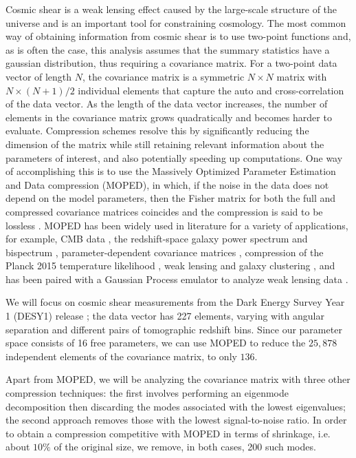 \documentclass[aps, prd, twocolumn, superscriptaddress, nofootinbib, amssymb, amsmath]{revtex4-2}
\begin{document}
Cosmic shear is a weak lensing effect caused by the large-scale structure of the universe and is an important tool for constraining cosmology. The most common way of obtaining information from cosmic shear is to use two-point functions and, as is often the case, this analysis assumes that the summary statistics have a gaussian distribution, thus requiring a covariance matrix. For a two-point data vector of length $N$, the covariance matrix is a symmetric $N\times N$ matrix with $N\times (N+1)/2$ individual elements that capture the auto and cross-correlation of the data vector. As the length of the data vector increases, the number of elements in the covariance matrix grows quadratically and becomes harder to evaluate. Compression schemes resolve this by significantly reducing the dimension of the matrix while still retaining relevant information about the parameters of interest, and also potentially speeding up computations. One way of accomplishing this is to use the Massively Optimized Parameter Estimation and Data compression (MOPED), in which, if the noise in the data does not depend on the model parameters, then the Fisher matrix for both the full and compressed covariance matrices coincides and the compression is said to be lossless \cite{Heavens:2000hjl, Tegmark:1997maa}. MOPED has been widely used in literature for a variety of applications, for example, CMB data \cite{Zablocki:2015zcm}, the redshift-space galaxy power spectrum and bispectrum \cite{Gualdi:2018mjl}, parameter-dependent covariance matrices \cite{Heavens:2017smv}, compression of the Planck 2015 temperature likelihood \cite{Heather:2019d}, weak lensing and galaxy clustering \cite{Ruggeri:2020rb}, and has been paired with a Gaussian Process emulator to analyze weak lensing data \cite{Mootoovaloo:2020}.

We will focus on cosmic shear measurements from the Dark Energy Survey Year 1 (DESY1) release \cite{Troxel:2017xyo,Abbott:2018cms}; the data vector has 227 elements, varying with angular separation and different pairs of tomographic redshift bins. Since our parameter space consists of 16 free parameters, we can use MOPED to reduce the $25,878$ independent elements of the covariance matrix, to only $136$.

Apart from MOPED, we will be analyzing the covariance matrix with three other compression techniques: the first involves performing an eigenmode decomposition then discarding the modes associated with the lowest eigenvalues; the second approach removes those with the lowest signal-to-noise ratio. In order to obtain a compression competitive with MOPED in terms of shrinkage, i.e. about $10\%$ of the original size, we remove, in both cases, 200 such modes.
\end{document}

